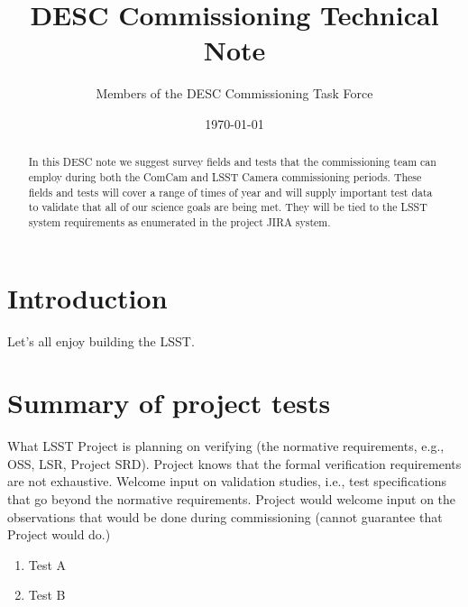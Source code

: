 \documentclass[modern]{desc-tex/styles/lsstdescnote}
\begin{document}
\title{DESC Commissioning Technical Note}
\author{Members of the DESC Commissioning Task Force}
\date{\today}

\begin{abstract}
  In this DESC note we suggest survey fields and tests that the
  commissioning team can employ during both the ComCam and LSST Camera
  commissioning periods.  These fields and tests will cover a range of
  times of year and will supply important test data to validate that
  all of our science goals are being met.  They will be tied to the
  LSST system requirements as enumerated in the project JIRA system.
\end{abstract}

\maketitle

\noindent
\begin{center}
  \fboxsep=5pt  
 \end{center} 
\vspace{0.1in}

\section{Introduction}

Let's all enjoy building the LSST.

\section{Summary of project tests}

What LSST Project is planning on verifying (the normative requirements, e.g., OSS, LSR, Project SRD).
Project knows that the formal verification requirements are not exhaustive.
Welcome input on validation studies, i.e., test specifications that go beyond the normative requirements.
Project would welcome input on the observations that would be done during commissioning (cannot guarantee that Project would do.)

\begin{enumerate}
\item Test A
\item Test B
\end{enumerate}
\end{document}
